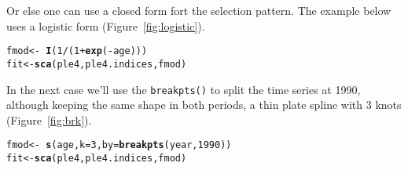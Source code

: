 \documentclass[a4paper,english,10pt]{article}\usepackage[]{graphicx}\usepackage[]{color}
\makeatletter
\newcommand{\hlnum}[1]{\textcolor[rgb]{0.686,0.059,0.569}{#1}}%
\newcommand{\hlopt}[1]{\textcolor[rgb]{0,0,0}{#1}}%
\newcommand{\hlstd}[1]{\textcolor[rgb]{0.345,0.345,0.345}{#1}}%
\newcommand{\hlkwb}[1]{\textcolor[rgb]{0.69,0.353,0.396}{#1}}%
\newcommand{\hlkwc}[1]{\textcolor[rgb]{0.333,0.667,0.333}{#1}}%
\newcommand{\hlkwd}[1]{\textcolor[rgb]{0.737,0.353,0.396}{\textbf{#1}}}%
\newenvironment{kframe}{%
 \def\at@end@of@kframe{}%
 \ifinner\ifhmode%
  \def\at@end@of@kframe{\end{minipage}}%
  \begin{minipage}{\columnwidth}%
 \fi\fi%
 \def\FrameCommand##1{\hskip\@totalleftmargin \hskip-\fboxsep
 \colorbox{shadecolor}{##1}\hskip-\fboxsep
     \hskip-\linewidth \hskip-\@totalleftmargin \hskip\columnwidth}%
 \MakeFramed {\advance\hsize-\width
   \@totalleftmargin\z@ \linewidth\hsize
   \@setminipage}}%
 {\par\unskip\endMakeFramed%
 \at@end@of@kframe}
\newenvironment{knitrout}{}{} %
\newcommand{\code}[1]{{\texttt{#1}}}
\makeatother
\begin{document}
\begin{knitrout}
\color{fgcolor}\begin{kframe}


{\ttfamily\noindent\bfseries{}}\end{kframe}
\end{knitrout}

Or else one can use a closed form fort the selection pattern. The example below uses a logistic form (Figure~\ref{fig:logistic}).

\begin{knitrout}
\color{fgcolor}\begin{kframe}
\begin{alltt}
\hlstd{fmod} \hlkwb{<-} \hlopt{~} \hlkwd{I}\hlstd{(}\hlnum{1}\hlopt{/}\hlstd{(}\hlnum{1}\hlopt{+}\hlkwd{exp}\hlstd{(}\hlopt{-}\hlstd{age)))}
\hlstd{fit} \hlkwb{<-} \hlkwd{sca}\hlstd{(ple4, ple4.indices, fmod)}
\end{alltt}


{\ttfamily\noindent\bfseries{}}\end{kframe}
\end{knitrout}

\begin{knitrout}
\color{fgcolor}\begin{kframe}


{\ttfamily\noindent\bfseries{}}\end{kframe}
\end{knitrout}

In the next case we'll use the \code{breakpts()} to split the time series at 1990, although keeping the same shape in both periods, a thin plate spline with 3 knots (Figure~\ref{fig:brk}).

\begin{knitrout}
\color{fgcolor}\begin{kframe}
\begin{alltt}
\hlstd{fmod} \hlkwb{<-} \hlopt{~}\hlkwd{s}\hlstd{(age,} \hlkwc{k} \hlstd{=} \hlnum{3}\hlstd{,} \hlkwc{by} \hlstd{=} \hlkwd{breakpts}\hlstd{(year,} \hlnum{1990}\hlstd{))}
\hlstd{fit} \hlkwb{<-} \hlkwd{sca}\hlstd{(ple4, ple4.indices, fmod)}
\end{alltt}


{\ttfamily\noindent\bfseries{}}\end{kframe}
\end{knitrout}
\end{document}
